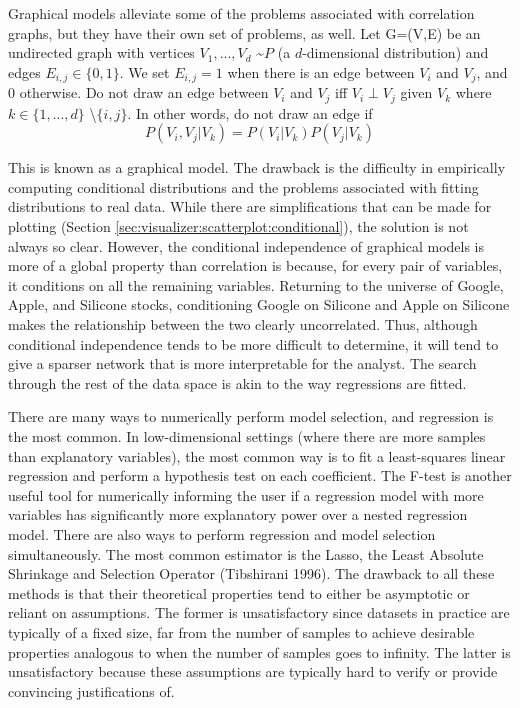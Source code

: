 Graphical models alleviate some of the problems associated with correlation
graphs, but they have their own set of problems, as well. Let G=(V,E) be an
undirected graph with vertices $V_1,...,V_d$ \textasciitilde $P$ (a
$d$-dimensional distribution) and edges $E_{i,j}\in\{0,1\}$. We set $E_{i,j}=1$
when there is an edge between $V_i$ and $V_j$, and 0 otherwise. Do not draw an
edge between $V_i$ and $V_j$ iff $V_i \perp V_j$ given $V_k$ where
$k\in\{1,...,d\}$ \textbackslash $\{i,j\}$. In other words, do not draw an edge
if
$$P(V_i,V_j|V_k)=P(V_i|V_k)P(V_j|V_k)$$

This is known as a graphical model. The drawback is the difficulty in
empirically computing conditional distributions and the problems associated with
fitting distributions to real data. While there are simplifications that can be
made for plotting (Section \ref{sec:visualizer:scatterplot:conditional}), the
solution is not always so clear. However, the conditional independence of
graphical models is more of a global property than correlation is because, for
every pair of variables, it conditions on all the remaining variables. Returning
to the universe of Google, Apple, and Silicone stocks, conditioning Google on
Silicone and Apple on Silicone makes the relationship between the two clearly
uncorrelated. Thus, although conditional independence tends to be more difficult
to determine, it will tend to give a sparser network that is more interpretable
for the analyst. The search through the rest of the data space is akin to the
way regressions are fitted.

There are many ways to numerically perform model selection, and regression is
the most common. In low-dimensional settings (where there are more samples than
explanatory variables), the most common way is to fit a least-squares linear
regression and perform a hypothesis test on each coefficient. The F-test is
another useful tool for numerically informing the user if a regression model
with more variables has significantly more explanatory power over a nested
regression model. There are also ways to perform regression and model selection
simultaneously. The most common estimator is the Lasso, the Least Absolute
Shrinkage and Selection Operator (Tibshirani 1996). The drawback to all these
methods is that their theoretical properties tend to either be asymptotic or
reliant on assumptions. The former is unsatisfactory since datasets in practice
are typically of a fixed size, far from the number of samples to achieve
desirable properties analogous to when the number of samples goes to infinity.
The latter is unsatisfactory because these assumptions are typically hard to
verify or provide convincing justifications of.

